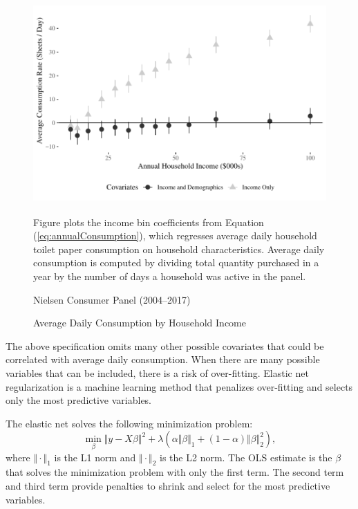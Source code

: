 \documentclass[AER]{AEA_mal}
\begin{document}
\begin{figure}[!htb]
\centering
\caption{Average Daily Consumption by Household Income}
\includegraphics[width = 5in, height = 3in]{../5_figures/annualPurchasesTP.pdf}
\begin{figurenotes}
Figure plots the income bin coefficients from Equation (\ref{eq:annualConsumption}), which regresses average daily household toilet paper consumption on household characteristics. Average daily consumption is computed by dividing total quantity purchased in a year by the number of days a household was active in the panel.
\end{figurenotes}
\begin{figurenotes}[Source]
Nielsen Consumer Panel (2004--2017)
\end{figurenotes}
\label{fig:annualPurchasesTP}
\end{figure}

The above specification omits many other possible covariates that could be correlated with average daily consumption. When there are many possible variables that can be included, there is a risk of over-fitting. Elastic net regularization is a machine learning method that penalizes over-fitting and selects only the most predictive variables.

The elastic net solves the following minimization problem:
\begin{equation}
\min_{\beta} \Vert y - X \beta \Vert^2 + \lambda \left(\alpha \Vert \beta \Vert_1 + (1 - \alpha) \Vert \beta \Vert^2_2 \right),
\end{equation}
where $\Vert \cdot \Vert_1$ is the L1 norm and $\Vert \cdot \Vert_2$ is the L2 norm. The OLS estimate is the $\beta$ that solves the minimization problem with only the first term. The second term and third term provide penalties to shrink and select for the most predictive variables.
\end{document}
